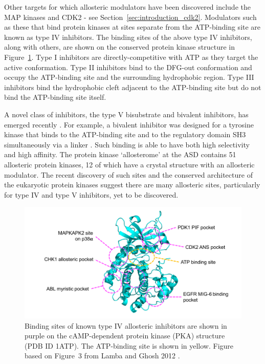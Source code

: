 Other targets for which allosteric modulators have been discovered include the MAP kinases \cite{Comess2011} and CDK2 \cite{Betzi2011} - see Section~\ref{sec:introduction_cdk2}.
Modulators such as these that bind protein kinases at sites separate from the ATP-binding site are known as type IV inhibitors.
The binding sites of the above type IV inhibitors, along with others, are shown on the conserved protein kinase structure in Figure~\ref{fig:kinase_mods}.
Type I inhibitors are directly-competitive with ATP as they target the active conformation.
Type II inhibitors bind to the DFG-out conformation and occupy the ATP-binding site and the surrounding hydrophobic region.
Type III inhibitors bind the hydrophobic cleft adjacent to the ATP-binding site but do not bind the ATP-binding site itself.

A novel class of inhibitors, the type V bisubstrate and bivalent inhibitors, has emerged recently \cite{Lamba2012}.
For example, a bivalent inhibitor was designed for a tyrosine kinase that binds to the ATP-binding site and to the regulatory domain SH3 simultaneously via a linker \cite{Hill2009}.
Such binding is able to have both high selectivity and high affinity.
The protein kinase `allosterome' at the ASD contains 51 allosteric protein kinases, 12 of which have a crystal structure with an allosteric modulator.
The recent discovery of such sites and the conserved architecture of the eukaryotic protein kinases suggest there are many allosteric sites, particularly for type IV and type V inhibitors, yet to be discovered.


\begin{figure}
\centering

\includegraphics[width=\textwidth]{figures/kinase_mods/kinase_mods}

\caption[Binding sites of known type IV allosteric inhibitors of protein kinases]
{Binding sites of known type IV allosteric inhibitors are shown in purple on the cAMP-dependent protein kinase (PKA) structure (PDB ID 1ATP).
The ATP-binding site is shown in yellow.
Figure based on Figure~3 from Lamba and Ghosh 2012 \cite{Lamba2012}.}

\label{fig:kinase_mods}
\end{figure}


